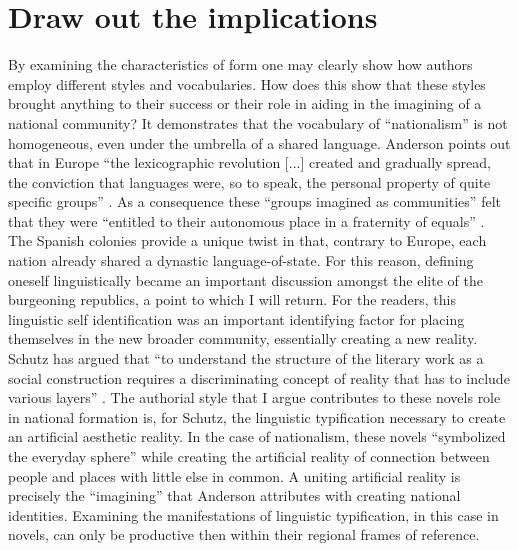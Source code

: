 \section{Draw out the implications}
By examining the characteristics of form one may clearly show how authors employ different styles and vocabularies.
How does this show that these styles brought anything to their success or their role in aiding in the imagining of a national community?
It demonstrates that the vocabulary of \enquote{nationalism} is not homogeneous, even under the umbrella of a shared language.
Anderson points out that in Europe \enquote{the lexicographic revolution [...] created and gradually spread, the conviction that languages were, so to speak, the personal property of quite specific groups} \autocite[84]{Anderson2006}.
As a consequence these \enquote{groups imagined as communities} felt that they were \enquote{entitled to their autonomous place in a fraternity of equals} \autocite[84]{Anderson2006}.
The Spanish colonies provide a unique twist in that, contrary to Europe, each nation already shared a dynastic language-of-state.
For this reason, defining oneself linguistically became an important discussion amongst the elite of the burgeoning republics, a point to which I will return.
For the readers, this linguistic self identification was an important identifying factor for placing themselves in the new broader community, essentially creating a new reality.
Schutz has argued that \enquote{to understand the structure of the literary work as a social construction requires a discriminating concept of reality that has to include various layers} \autocite[79]{Embree1998}.
The authorial style that I argue contributes to these novels role in national formation is, for Schutz, the linguistic typification necessary to create an artificial aesthetic reality.
In the case of nationalism, these novels \enquote{symbolized the everyday sphere} while creating the artificial reality of connection between people and places with little else in common.
A uniting artificial reality is precisely the \enquote{imagining} that Anderson attributes with creating national identities. 
Examining the manifestations of linguistic typification, in this case in novels, can only be productive then within their regional frames of reference.


